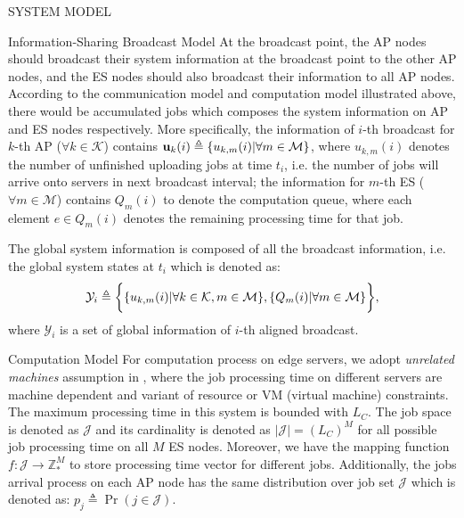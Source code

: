\documentclass[10pt, conference, letterpaper]{IEEEtran}
\newcommand{\domZ}{\mathbb{Z}_{*}}
\newcommand{\define}{\triangleq}
\renewcommand{\vec}{\mathbf}
\DeclarePairedDelimiter{\set}{\{}{\}}
\DeclarePairedDelimiter{\Brace}{\bigg\{}{\bigg\}}
\newcommand{\apSet}{\mathcal{K}}
\newcommand{\esSet}{\mathcal{M}}
\newcommand{\jSpace}{\mathcal{J}}
\newcommand{\Obsv}{\mathcal{Y}}
\begin{document}
\begin{section}{SYSTEM MODEL}
\begin{subsection}{Information-Sharing Broadcast Model}
            At the broadcast point, the AP nodes should broadcast their system information at the broadcast point to the other AP nodes, and the ES nodes should also broadcast their information to all AP nodes. According to the communication model and computation model illustrated above, there would be accumulated jobs which composes the system information on AP and ES nodes respectively.
            More specifically, the information of $i$-th broadcast for $k$-th AP ($\forall k\in\apSet$) contains $\vec{u}_k(i) \define \set{u_{k,m}(i)|\forall m\in\esSet}$, where $u_{k,m}(i)$ denotes the number of unfinished uploading jobs at time $t_i$, i.e. the number of jobs will arrive onto servers in next broadcast interval; the information for $m$-th ES ($\forall m\in\esSet$) contains $Q_m(i)$ to denote the computation queue, where each element $e \in Q_m(i)$ denotes the remaining processing time for that job.
            
            The global system information is composed of all the broadcast information, i.e. the global system states at $t_i$ which is denoted as:
            \begin{align}
                \Obsv_i \define \Brace{ \set{u_{k,m}(i)|\forall k\in\apSet,m\in\esSet}, \set{Q_m(i)|\forall m\in\esSet} },
            \end{align}
            where $\Obsv_i$ is a set of global information of $i$-th aligned broadcast.
        \end{subsection}

        \begin{subsection}{Computation Model}
            For computation process on edge servers, we adopt \emph{unrelated machines} assumption in \cite{tan-online}, where the job processing time on different servers are machine dependent and variant of resource or VM (virtual machine) constraints.
            The maximum processing time in this system is bounded with $L_C$.
            The job space is denoted as $\jSpace$ and its cardinality is denoted as $|\jSpace|=(L_C)^M$ for all possible job processing time on all $M$ ES nodes.
            Moreover, we have the mapping function $f:\jSpace \to \domZ^M$ to store processing time vector for different jobs.
            Additionally, the jobs arrival process on each AP node has the same distribution over job set $\jSpace$ which is denoted as: $p_j \define \Pr(j\in\jSpace)$.
            

\end{subsection}
\end{section}
\end{document}
